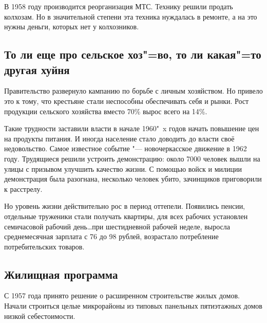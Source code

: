 В 1958 году производится реорганизация МТС. Технику решили продать колхозам. Но в значительной степени эта техника нуждалась в ремонте, а на это нужны деньги, которых нет у колхозников.

\subsection{То ли еще про сельское хоз"=во, то ли какая"=то другая хуйня}

Правительство развернуло кампанию по борьбе с личным хозяйством. Но привело это к тому, что крестьяне стали неспособны обеспечивать себя и рынки. Рост продукции сельского хозяйства вместо 70\% вырос всего на 14\%.

Такие трудности заставили власти в начале 1960"~x годов начать повышение цен на продукты питания. И иногда население стало доводить до власти своё недовольство. Самое известное событие "--- новочеркасское движение в 1962 году. Трудящиеся решили устроить демонстрацию: около 7000 человек вышли на улицы с призывом улучшить качество жизни. С помощью войск и милиции демонстрация была разогнана, несколько человек убито, зачинщиков приговорили к расстрелу.

Но уровень жизни действительно рос в период оттепели. Появились пенсии, отдельные труженики стали получать квартиры, для всех рабочих установлен семичасовой рабочий день\dots при шестидневной рабочей неделе, выросла среднемесячная зарплата с 76 до 98 рублей, возрастало потребление потребительских товаров.

\subsection{Жилищная программа}

С 1957 года принято решение о расширенном строительстве жилых домов. Начали строиться целые микрорайоны из типовых панельных пятиэтажных домов низкой себестоимости.
